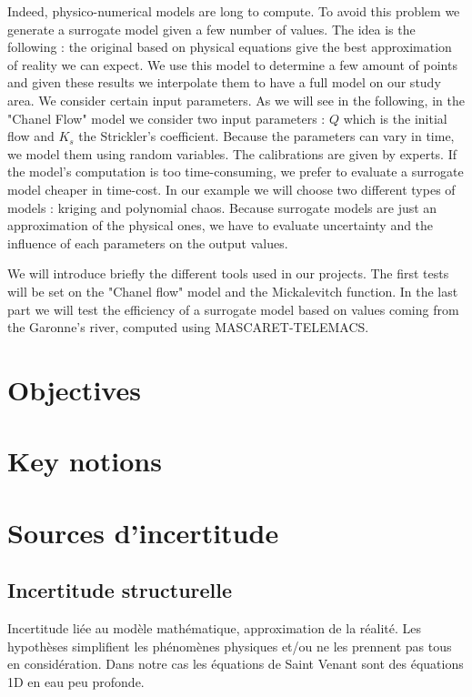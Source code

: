 \documentclass[hidelinks,12pt]{article}
\begin{document}
Indeed, physico-numerical models are long to compute. To avoid this problem we generate a surrogate model given a few number of values. The idea is the following : the original based on physical equations give the best approximation of reality we can expect. We use this model to determine a few amount of points and given these results we interpolate them to have a full model on our study area. 
We consider certain input parameters. As we will see in the following, in the "Chanel Flow" model we consider two input parameters : $Q$ which is the initial flow and $K_s$ the Strickler's coefficient. Because the parameters can vary in time, we model them using random variables. The calibrations are given by experts. 
If the model's computation is too time-consuming, we prefer to evaluate a surrogate model cheaper in time-cost. In our example we will choose two different types of models : kriging and polynomial chaos. Because surrogate models are just an approximation of the physical ones, we have to evaluate uncertainty and the influence of each parameters on the output values.

We will introduce briefly the different tools used in our projects. The first tests will be set on the "Chanel flow" model and the Mickalevitch function. In the last part we will test the efficiency of a surrogate model based on values coming from the Garonne's river, computed using MASCARET-TELEMACS.


\section{Objectives}
\section{Key notions}


\section{Sources d’incertitude}



\subsection{Incertitude structurelle }

Incertitude liée au modèle mathématique, approximation de la réalité. Les hypothèses simplifient les phénomènes physiques et/ou ne les prennent pas tous en considération. Dans notre cas les équations de Saint Venant sont des équations 1D en eau peu profonde.
\end{document}
